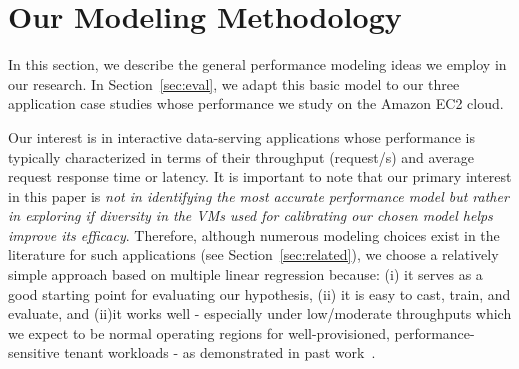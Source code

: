 \section{Our Modeling Methodology}
\label{sec:model}
\vspace{10pt}

In this section, we describe the general performance modeling ideas we employ in our research. In Section~\ref{sec:eval}, %
we adapt this basic model to our three application case studies whose performance we study on the Amazon EC2 cloud. 

Our interest is in interactive data-serving applications whose %
performance is typically %
characterized in terms of their throughput (request/s) and average request response time or latency.  %
 It is important to note that our primary interest in this paper is {\em not in identifying the most accurate performance model but rather in exploring if diversity in the VMs used for calibrating our chosen model helps improve its efficacy}. 
Therefore, although numerous modeling choices exist in the literature for such applications (see Section~\ref{sec:related}), we choose a relatively simple approach based on multiple linear regression because: (i) it serves as a good starting point for evaluating our hypothesis, (ii) it is easy to cast, train, and evaluate, and (ii)it  works well - especially under low/moderate throughputs which we expect to be normal operating regions for well-provisioned, performance-sensitive tenant workloads -  as demonstrated in past work~\cite{Stewart07,Kelly:2005:DPA:1251522.1251530}. 


